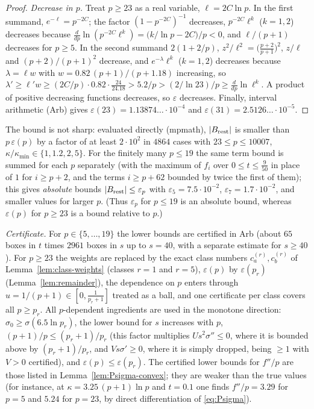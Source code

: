\begin{proof}
\emph{Decrease in $p$.} Treat $p\ge23$ as a real variable, $\ell=2C\ln p$. In the first summand, $e^{-\ell}=p^{-2C}$; the factor $(1-p^{-2C})^{-1}$ decreases, $p^{-2C}\ell^k$ ($k=1,2$) decreases because $\frac{d}{dp}\ln(p^{-2C}\ell^k)=\bigl(k/\ln p-2C\bigr)/p<0$, and $\ell/(p+1)$ decreases for $p\ge5$. In the second summand $2(1+2/p)$, $z^2/\ell^2=\bigl(\tfrac{p+2}{p+1}\bigr)^2$, $z/\ell$ and $(p+2)/(p+1)^2$ decrease, and $e^{-\lambda}\ell^k$ ($k=1,2$) decreases because $\lambda=\ell w$ with $w=0.82\,(p+1)/(p+1.18)$ increasing, so $\lambda'\ge\ell'w\ge(2C/p)\cdot0.82\cdot\tfrac{24}{24.18}>5.2/p>(2/\ln23)/p\ge\frac d{dp}\ln\ell^k$. A product of positive decreasing functions decreases, so $\varepsilon$ decreases. Finally, interval arithmetic (Arb) gives $\varepsilon(23)=1.13874\ldots\cdot10^{-4}$ and $\varepsilon(31)=2.5126\ldots\cdot10^{-5}$.
\end{proof}

The bound is not sharp: evaluated directly (mpmath), $|B_{\rm rest}|$ is smaller than $p\,\varepsilon(p)$ by a factor of at least $2\cdot10^2$ in $4864$ cases with $23\le p\le10007$, $\kappa/\kappa_{\min}\in\{1,1.2,2,5\}$. For the finitely many $p\le19$ the same term bound is summed for each $p$ separately (with the maximum of $f_i$ over $0\le t\le\tfrac9{50}$ in place of $1$ for $i\ge p+2$, and the terms $i\ge p+62$ bounded by twice the first of them); this gives \emph{absolute} bounds $|B_{\rm rest}|\le\varepsilon_p$ with $\varepsilon_5=7.5\cdot10^{-2}$, $\varepsilon_7=1.7\cdot10^{-2}$, and smaller values for larger $p$. (Thus $\varepsilon_p$ for $p\le19$ is an absolute bound, whereas $\varepsilon(p)$ for $p\ge23$ is a bound relative to $p$.)

\emph{Certificate.} For $p\in\{5,\dots,19\}$ the lower bounds are certified in Arb (about $65$ boxes in $t$ times $2961$ boxes in $s$ up to $s=40$, with a separate estimate for $s\ge40$). For $p\ge23$ the weights are replaced by the exact class numbers $c_a^{(r)},c_b^{(r)}$ of Lemma~\ref{lem:class-weights} (classes $r=1$ and $r=5$), $\varepsilon(p)$ by $\varepsilon(p_r)$ (Lemma~\ref{lem:remainder}), the dependence on $p$ enters through $u=1/(p+1)\in[0,\tfrac1{p_r+1}]$ treated as a ball, and one certificate per class covers all $p\ge p_r$. All $p$-dependent ingredients are used in the monotone direction: $\sigma_0\ge\sigma(6.5\ln p_r)$, the lower bound for $s$ increases with $p$, $(p+1)/p\le(p_r+1)/p_r$ (this factor multiplies $U s^2\sigma''\le0$, where it is bounded above by $(p_r+1)/p_r$, and $V s\sigma'\ge0$, where it is simply dropped, being $\ge1$ with $V>0$ certified), and $\varepsilon(p)\le\varepsilon(p_r)$. The certified lower bounds for $f''/p$ are those listed in Lemma~\ref{lem:Psigma-convex}; they are weaker than the true values (for instance, at $\kappa=3.25\,(p+1)\ln p$ and $t=0.1$ one finds $f''/p=3.29$ for $p=5$ and $5.24$ for $p=23$, by direct differentiation of \eqref{eq:Psigma}).

